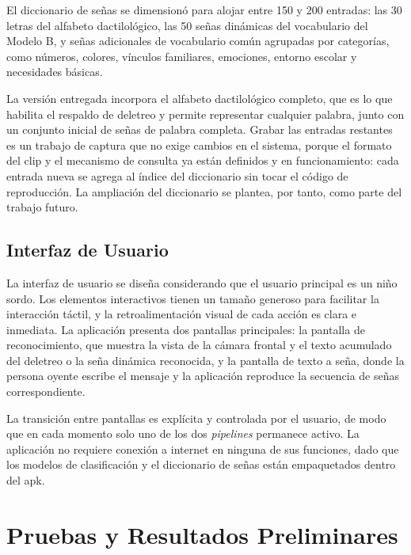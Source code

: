 El diccionario de señas se dimensionó para alojar entre 150 y 200 entradas: las 30 letras
del alfabeto dactilológico, las 50 señas dinámicas del vocabulario del Modelo B, y señas
adicionales de vocabulario común agrupadas por categorías, como números, colores,
vínculos familiares, emociones, entorno escolar y necesidades básicas.

La versión entregada incorpora el alfabeto dactilológico completo, que es lo que habilita
el respaldo de deletreo y permite representar cualquier palabra, junto con un conjunto
inicial de señas de palabra completa. Grabar las entradas restantes es un trabajo de
captura que no exige cambios en el sistema, porque el formato del clip y el mecanismo de
consulta ya están definidos y en funcionamiento: cada entrada nueva se agrega al índice
del diccionario sin tocar el código de reproducción. La ampliación del diccionario se
plantea, por tanto, como parte del trabajo futuro.

\subsection{Interfaz de Usuario}
\label{sec:interfaz-usuario}

La interfaz de usuario se diseña considerando que el usuario principal es un niño
sordo. Los elementos interactivos tienen un tamaño generoso para facilitar la
interacción táctil, y la retroalimentación visual de cada acción es clara e
inmediata. La aplicación presenta dos pantallas principales: la pantalla de
reconocimiento, que muestra la vista de la cámara frontal y el texto acumulado del
deletreo o la seña dinámica reconocida, y la pantalla de texto a seña, donde la
persona oyente escribe el mensaje y la aplicación reproduce la secuencia de señas
correspondiente.

La transición entre pantallas es explícita y controlada por el usuario, de modo que
en cada momento solo uno de los dos \textit{pipelines} permanece activo. La
aplicación no requiere conexión a internet en ninguna de sus funciones, dado que los
modelos de clasificación y el diccionario de señas están empaquetados dentro del
\acrshort{apk}.

\section{Pruebas y Resultados Preliminares}

